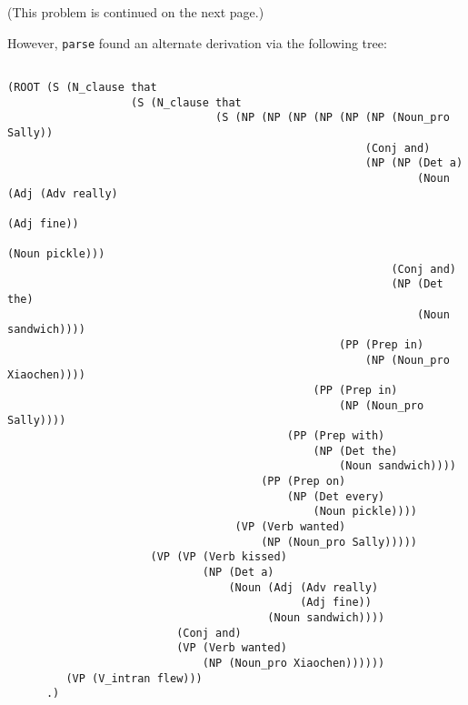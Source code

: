\documentclass[11pt]{article}
\newcommand{\code}[1]{\texttt{#1}}
\begin{document}
\begin{enumerate}
\begin{lstlisting}
	\end{lstlisting}
	(This problem is continued on the next page.)
	\newpage
	
	However, \code{parse} found an alternate derivation via the following tree:
	\begin{lstlisting}
	
(ROOT (S (N_clause that
                   (S (N_clause that
                                (S (NP (NP (NP (NP (NP (NP (Noun_pro Sally))
                                                       (Conj and)
                                                       (NP (NP (Det a)
                                                               (Noun (Adj (Adv really)
                                                                          (Adj fine))
                                                                     (Noun pickle)))
                                                           (Conj and)
                                                           (NP (Det the)
                                                               (Noun sandwich))))
                                                   (PP (Prep in)
                                                       (NP (Noun_pro Xiaochen))))
                                               (PP (Prep in)
                                                   (NP (Noun_pro Sally))))
                                           (PP (Prep with)
                                               (NP (Det the)
                                                   (Noun sandwich))))
                                       (PP (Prep on)
                                           (NP (Det every)
                                               (Noun pickle))))
                                   (VP (Verb wanted)
                                       (NP (Noun_pro Sally)))))
                      (VP (VP (Verb kissed)
                              (NP (Det a)
                                  (Noun (Adj (Adv really)
                                             (Adj fine))
                                        (Noun sandwich))))
                          (Conj and)
                          (VP (Verb wanted)
                              (NP (Noun_pro Xiaochen))))))
         (VP (V_intran flew)))
      .)
      
	\end{lstlisting}
	

\end{enumerate}
\end{document}
